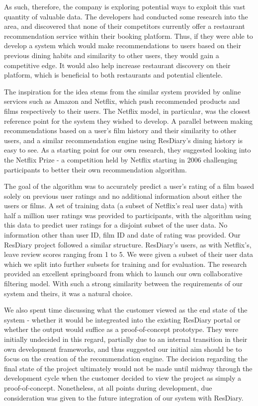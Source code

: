 \documentclass{l3proj}
\begin{document}
As such, therefore, the company is exploring potential ways to exploit this vast quantity of valuable data. The developers had conducted some research into the area, and discovered that none of their competitors currently offer a restaurant recommendation service within their booking platform. Thus, if they were able to develop a system which would make recommendations to users based on their previous dining habits and similarity to other users, they would gain a competitive edge. It would also help increase restaurant discovery on their platform, which is beneficial to both restaurants and potential clientele. 

The inspiration for the idea stems from the similar system provided by online services such as Amazon and Netflix, which push recommended products and films respectively to their users. The Netflix model, in particular, was the closest reference point for the system they wished to develop. A parallel between making recommendations based on a user's film history and their similarity to other users, and a similar recommendation engine using ResDiary's dining history is easy to see. As a starting point for our own research, they suggested looking into the Netflix Prize - a competition held by Netflix starting in 2006 challenging participants to better their own recommendation algorithm. 

The goal of the algorithm was to accurately predict a user's rating of a film based solely on previous user ratings and no additional information about either the users or films. A set of training data (a subset of Netflix's real user data) with half a million user ratings was provided to participants, with the algorithm using this data to predict user ratings for a disjoint subset of the user data. No information other than user ID, film ID and date of rating was provided. Our ResDiary project followed a similar structure. ResDiary's users, as with Netflix's, leave review scores ranging from 1 to 5. We were given a subset of their user data which we split into further subsets for training and for evaluation. The research provided an excellent springboard from which to launch our own collaborative filtering model. With such a strong similarity between the requirements of our system and theirs, it was a natural choice.


We also spent time discussing what the customer viewed as the end state of the system - whether it would be integreated into the existing ResDiary portal or whether the output would suffice as a proof-of-concept prototype. They were initially undecided in this regard, partially due to an internal transition in their own development frameworks, and thus suggested our initial aim should be to focus on the creation of the recommendation engine. The decision regarding the final state of the project ultimately would not be made until midway through the development cycle when the customer decided to view the project as simply a proof-of-concept. Nonetheless, at all points during development, due consideration was given to the future integration of our system with ResDiary. 
\end{document}
